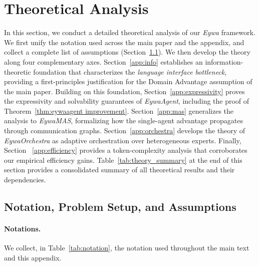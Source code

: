 \documentclass{llmxive}
\begin{document}
{\renewcommand\contentsname{\Large Table of Contents}



\tableofcontents



\section{Theoretical Analysis}
\label{app:theory}
In this section, we conduct a detailed theoretical analysis of our \textit{Eywa} framework.
We first unify the notation used across the main paper and the appendix, and collect a complete list of assumptions (Section~\ref{app:notation}). We then develop the theory along four complementary axes. Section~\ref{app:info} establishes an information-theoretic foundation that characterizes the \emph{language interface bottleneck}, providing a first-principles justification for the Domain Advantage assumption of the main paper. Building on this foundation, Section~\ref{app:expressivity} proves the expressivity and solvability guarantees of \textit{EywaAgent}, including the proof of Theorem~\ref{thm:eywaagent improvement}. Section~\ref{app:mas} generalizes the analysis to \textit{EywaMAS}, formalizing how the single-agent advantage propagates through communication graphs. Section~\ref{app:orchestra} develops the theory of \textit{EywaOrchestra} as adaptive orchestration over heterogeneous experts.
Finally, Section ~\ref{app:efficiency} provides a token-complexity analysis that corroborates our empirical efficiency gains. Table~\ref{tab:theory_summary} at the end of this section provides a consolidated summary of all theoretical results and their dependencies.


\subsection{Notation, Problem Setup, and Assumptions}
\label{app:notation}
\paragraph{Notations.}
We collect, in Table~\ref{tab:notation}, the notation used throughout the main text and this appendix. 


}
\end{document}
